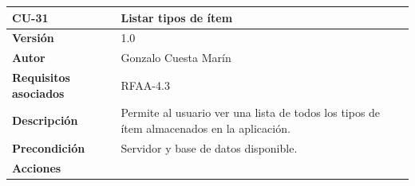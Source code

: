 \documentclass[
]{article}
\begin{document}
\begin{longtable}[]{@{}ll@{}}
\toprule
\begin{minipage}[b]{0.18\columnwidth}\raggedright
\textbf{CU-31}\strut
\end{minipage} & \begin{minipage}[b]{0.76\columnwidth}\raggedright
\textbf{Listar tipos de ítem}\strut
\end{minipage}\tabularnewline
\midrule
\endhead
\begin{minipage}[t]{0.18\columnwidth}\raggedright
\textbf{Versión}\strut
\end{minipage} & \begin{minipage}[t]{0.76\columnwidth}\raggedright
1.0\strut
\end{minipage}\tabularnewline
\begin{minipage}[t]{0.18\columnwidth}\raggedright
\textbf{Autor}\strut
\end{minipage} & \begin{minipage}[t]{0.76\columnwidth}\raggedright
Gonzalo Cuesta Marín\strut
\end{minipage}\tabularnewline
\begin{minipage}[t]{0.18\columnwidth}\raggedright
\textbf{Requisitos asociados}\strut
\end{minipage} & \begin{minipage}[t]{0.76\columnwidth}\raggedright
RFAA-4.3\strut
\end{minipage}\tabularnewline
\begin{minipage}[t]{0.18\columnwidth}\raggedright
\textbf{Descripción}\strut
\end{minipage} & \begin{minipage}[t]{0.76\columnwidth}\raggedright
Permite al usuario ver una lista de todos los tipos de ítem almacenados
en la aplicación.\strut
\end{minipage}\tabularnewline
\begin{minipage}[t]{0.18\columnwidth}\raggedright
\textbf{Precondición}\strut
\end{minipage} & \begin{minipage}[t]{0.76\columnwidth}\raggedright
Servidor y base de datos disponible.\strut
\end{minipage}\tabularnewline
\begin{minipage}[t]{0.18\columnwidth}\raggedright
\textbf{Acciones}\strut
\end{minipage} & \begin{minipage}[t]{0.76\columnwidth}\raggedright
\begin{enumerate}

\end{enumerate}
\end{minipage}
\end{longtable}
\end{document}
